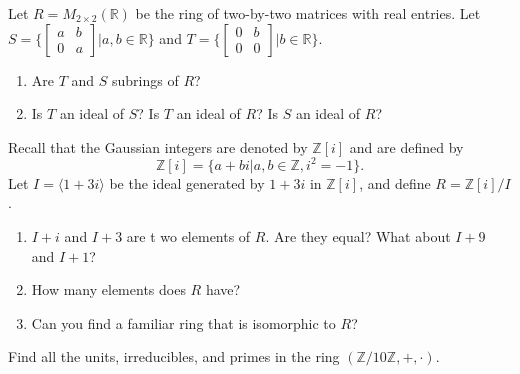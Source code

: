 \documentclass[12pt,letterpaper,boxed]{hmcpset}
\begin{document}



\begin{problem}[16.1.14]
Let $R = M_{2 \times 2}(\mathbb{R})$ be the ring of two-by-two matrices with real entries. Let $S = 
 \{ \begin{bmatrix}
    a & b \\
    0 & a
  \end{bmatrix}
  \vert a,b \in \mathbb{R} \} $ and $T = 
  \{ \begin{bmatrix}
    0 & b \\
    0 & 0
  \end{bmatrix}
  \vert b \in \mathbb{R} \} $.
\begin{enumerate}[label=\alph*]
\item Are $T$ and $S$ subrings of $R$?
\item Is $T$ an ideal of $S$? Is $T$ an ideal of $R$? Is $S$ an ideal of $R$?
\end{enumerate}
\end{problem}

\begin{solution}
\end{solution}

\clearpage

\begin{problem}[16.2.7]
Recall that the Gaussian integers are denoted by $\mathbb{Z}[i]$ and are defined by $$ \mathbb{Z}[i] = \{ a + bi \vert a,b \in  \mathbb{Z}, i^2 = -1 \}. $$
Let $I = \langle 1 + 3i \rangle$ be the ideal generated by $1+3i$ in $\mathbb{Z}[i]$, and define $R = \mathbb{Z}[i]/I$. 
\begin{enumerate}[label=\alph*]
\item $I+i$ and $I+3$ are t wo elements of $R$. Are they equal? What about $I+9$ and $I+1$?
\item How many elements does $R$ have?
\item Can you find a familiar ring that is isomorphic to $R$?
\end{enumerate}
\end{problem}

\begin{solution}
\end{solution}

\clearpage

\begin{problem}[18.1.4]
Find all the units, irreducibles, and primes in the ring $(\mathbb{Z}/10\mathbb{Z}, +, \cdot)$. 
\end{problem}
\end{document}
